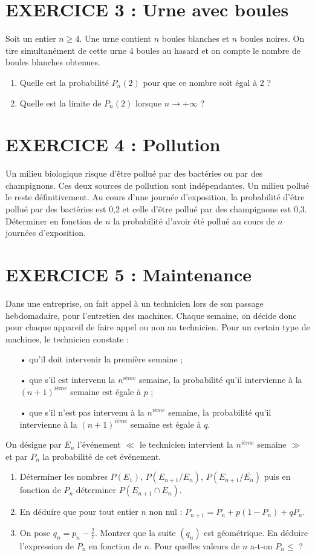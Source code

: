 \documentclass[12pt]{article}
\begin{document}
\section*{EXERCICE 3 : Urne avec boules}
Soit un entier $n \geq 4$. Une urne contient $n$ boules blanches et $n$ boules noires. On tire simultanément de cette urne 4 boules au hasard et on compte le nombre de boules blanches obtenues.
\begin{enumerate}
    \item Quelle est la probabilité $P_n(2)$ pour que ce nombre soit égal à 2 ?
    \item Quelle est la limite de $P_n(2)$ lorsque $n \rightarrow +\infty$ ?
\end{enumerate}

\section*{EXERCICE 4 : Pollution}
Un milieu biologique risque d’être pollué par des bactéries ou par des champignons. Ces deux sources de pollution sont indépendantes. Un milieu pollué le reste définitivement.
Au cours d’une journée d’exposition, la probabilité d’être pollué par des bactéries est 0,2 et celle d’être pollué par des champignons est 0,3.
Déterminer en fonction de $n$ la probabilité d’avoir été pollué au cours de $n$ journées d’exposition.

\section*{EXERCICE 5 : Maintenance}
Dans une entreprise, on fait appel à un technicien lors de son passage hebdomadaire, pour l’entretien des machines.
Chaque semaine, on décide donc pour chaque appareil de faire appel ou non au technicien. Pour un certain type de machines, le technicien constate :
\begin{itemize}
    \item[•] qu'il doit intervenir la première semaine ;
   \item[•] que s'il est intervenu la $n^{ième}$ semaine, la probabilité qu'il intervienne à la $(n+1)^{ième}$ semaine est égale à $p$ ;
    \item[•] que s’il n’est pas intervenu à la $n^{ième}$ semaine, la probabilité qu’il intervienne à la $(n+1)^{ième}$ semaine est égale à $q$.
\end{itemize}
On désigne par $E_n$ l’événement $\ll$ le technicien intervient la $n^{ième}$ semaine $\gg$ et par $P_n$ la probabilité de cet événement.
\begin{enumerate}
    \item Déterminer les nombres $P(E_1)$, $P(E_{n+1}/E_n)$, $P(E_{n+1}/\overline{E_n})$ puis en fonction de $P_n$ déterminer $P(E_{n+1} \cap E_n)$.
   \item En déduire que pour tout entier $n$ non nul : $P_{n+1} = P_n + p(1-P_n) + qP_n$.
   \item On pose $q_n = p_n - \frac{2}{7}$. Montrer que la suite $(q_n)$ est géométrique. En déduire l’expression de $P_n$ en fonction de $n$. Pour quelles valeurs de $n$ a-t-on $P_n \leq$ ?
\end{enumerate}
\end{document}
